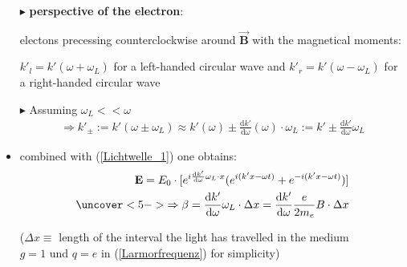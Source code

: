 \documentclass[10pt,a4paper]{beamer}
\begin{document}
\begin{frame}
\begin{itemize}
\item[$\blacktriangleright$] \textbf{perspective of the electron}:\newline\pause
\begin{small}\noindent electons precessing counterclockwise around $\vec{\textbf{B}}$ with the magnetical moments: 
\end{small}\newline
$k'_l = k'(\omega + \omega_L)$ for a left-handed circular wave and \newline
$k'_r = k'(\omega - \omega_L)$ for a right-handed circular wave\newline\pause
\item[$\blacktriangleright$] Assuming $\omega_L << \omega$
\begin{align*}
\Rightarrow k'_{\pm} := k'(\omega \pm \omega_L) \approx k'(\omega) \pm \frac{\text{d} k'}{\text{d} \omega}(\omega)\cdot\omega_L := k' \pm \frac{\text{d}k'}{\text{d}\omega}\omega_L
\end{align*}\pause
\item combined with (\ref{Lichtwelle_1}) one obtains:
\begin{align*}
\textbf{E} = E_0\cdot[e^{i\frac{\text{d} k'}{\text{d} \omega}\omega_L \cdot x}(e^{i(k' x - \omega t)}+e^{-i(k' x - \omega t)})]\\
\uncover<5->{\Rightarrow \beta = \frac{\text{d} k'}{\text{d} \omega}\omega_L\cdot \Delta x = \frac{\text{d} k'}{\text{d} \omega}\frac{e}{2m_e}B\cdot \Delta x}
\end{align*}\pause
\begin{small}($\Delta x \equiv$ length of the interval the light has travelled in the medium\\
 $g = 1$ und $ q = e $ in (\ref{Larmorfrequenz}) for simplicity)
\end{small}
\end{itemize}
\end{frame}
\end{document}
